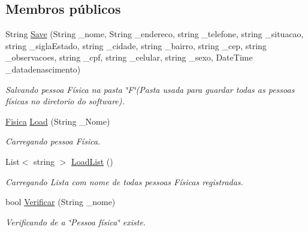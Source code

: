 \subsection*{Membros públicos}
\begin{DoxyCompactItemize}
\item 
String \hyperlink{class_model_1_1_pessoa__e___usuario_1_1_fisica_a6938671249e215e455665ce5084b5c9b}{Save} (String \+\_\+nome, String \+\_\+endereco, string \+\_\+telefone, string \+\_\+situacao, string \+\_\+sigla\+Estado, string \+\_\+cidade, string \+\_\+bairro, string \+\_\+cep, string \+\_\+observacoes, string \+\_\+cpf, string \+\_\+celular, string \+\_\+sexo, Date\+Time \+\_\+datadenascimento)
\begin{DoxyCompactList}\small\item\em Salvando pessoa Física na pasta \char`\"{}\+F\char`\"{}(Pasta usada para guardar todas as pessoas físicas no diretorio do software). \end{DoxyCompactList}\item 
\hyperlink{class_model_1_1_pessoa__e___usuario_1_1_fisica}{Fisica} \hyperlink{class_model_1_1_pessoa__e___usuario_1_1_fisica_a13ff6dd977b906babecb398560d8601e}{Load} (String \+\_\+\+Nome)
\begin{DoxyCompactList}\small\item\em Carregando pessoa Física. \end{DoxyCompactList}\item 
List$<$ string $>$ \hyperlink{class_model_1_1_pessoa__e___usuario_1_1_fisica_a9f771ef7f7b741221c0821a1a0547318}{Load\+List} ()
\begin{DoxyCompactList}\small\item\em Carregando Lista com nome de todas pessoas Físicas registradas. \end{DoxyCompactList}\item 
bool \hyperlink{class_model_1_1_pessoa__e___usuario_1_1_fisica_a2084087f39edc38a532ebbc07811202d}{Verificar} (String \+\_\+nome)
\begin{DoxyCompactList}\small\item\em Verificando de a \char`\"{}\+Pessoa física\char`\"{} existe. \end{DoxyCompactList}\end{DoxyCompactItemize}
